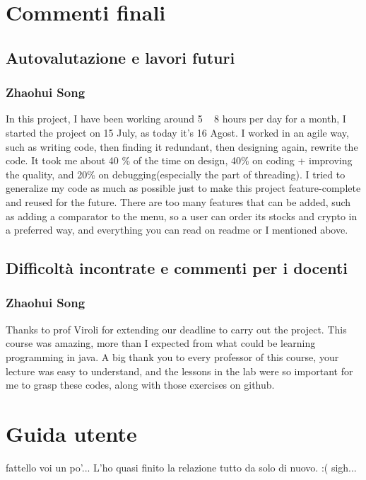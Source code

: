 \documentclass[a4paper,12pt]{report}
\begin{document}
\chapter{Commenti finali}

\section{Autovalutazione e lavori futuri}

\subsection*{Zhaohui Song}
In this project, I have been working around 5 ~ 8 hours per day for a month, I started the project on 15 July,  as today it's 16 Agost.
%
I worked in an agile way, such as writing code, then finding it redundant, then designing again, rewrite the code. 
%
It took me about 40 \% of the time on design, 40\% on coding + improving the quality, and 20\% on debugging(especially the part of threading). 
%
I tried to generalize my code as much as possible just to make this project feature-complete and reused for the future. 
%
There are too many features that can be added, such as adding a comparator to the menu, so a user can order its stocks and crypto in a preferred way, and everything you can read on readme or I mentioned above.  

\section{Difficoltà incontrate e commenti per i docenti}
\subsection*{Zhaohui Song}
Thanks to prof Viroli for extending our deadline to carry out the project.
%
This course was amazing, more than I expected from what could be learning programming in java. 
%
A big thank you to every professor of this course, your lecture was easy to understand, and the lessons in the lab were so important for me to grasp these codes, along with those exercises on github.

\appendix
\chapter{Guida utente}

fattello voi un po'... L'ho quasi finito la relazione tutto da solo di nuovo. :( sigh...
\end{document}
